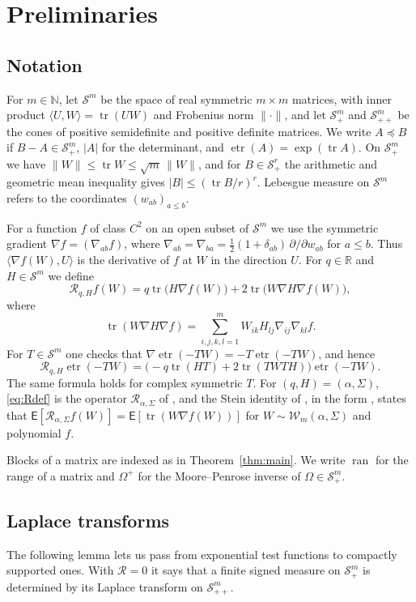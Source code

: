 \documentclass{amsart}
\theoremstyle{definition}
\theoremstyle{remark}
\numberwithin{equation}{section}
\newcommand{\R}{\mathbb{R}}
\newcommand{\N}{\mathbb{N}}
\newcommand{\E}{\mathsf{E}}
\newcommand{\Sym}{\mathcal{S}}
\newcommand{\W}{\mathcal{W}}
\newcommand{\Rop}{\mathcal{R}}
\newcommand{\tr}{\operatorname{tr}}
\newcommand{\etr}{\operatorname{etr}}
\newcommand{\ran}{\operatorname{ran}}
\newcommand{\ip}[2]{\langle #1,#2\rangle}
\begin{document}
\section{Preliminaries}\label{sec:prelim}

\subsection{Notation}
For $m\in\N$, let $\Sym^m$ be the space of real symmetric $m\times m$ matrices, with inner product $\ip UW=\tr(UW)$ and Frobenius norm $\|\cdot\|$, and let $\Sym^m_+$ and $\Sym^m_{++}$ be the cones of positive semidefinite and positive definite matrices. We write $A\preceq B$ if $B-A\in\Sym^m_+$, $|A|$ for the determinant, and $\etr(A)=\exp(\tr A)$. On $\Sym^m_+$ we have $\|W\|\le\tr W\le\sqrt m\,\|W\|$, and for $B\in\Sym^r_+$ the arithmetic and geometric mean inequality gives $|B|\le(\tr B/r)^r$. Lebesgue measure on $\Sym^m$ refers to the coordinates $(w_{ab})_{a\le b}$.

For a function $f$ of class $C^2$ on an open subset of $\Sym^m$ we use the symmetric gradient $\nabla f=(\nabla_{ab}f)$, where $\nabla_{ab}=\nabla_{ba}=\frac12(1+\delta_{ab})\,\partial/\partial w_{ab}$ for $a\le b$. Thus $\ip{\nabla f(W)}{U}$ is the derivative of $f$ at $W$ in the direction $U$. For $q\in\R$ and $H\in\Sym^m$ we define
\begin{equation}\label{eq:Rdef}
\Rop_{q,H}f(W)=q\tr\bigl(H\nabla f(W)\bigr)+2\tr\bigl(W\nabla H\nabla f(W)\bigr),
\end{equation}
where
\[
\tr(W\nabla H\nabla f)=\sum_{i,j,k,l=1}^m W_{ik}H_{lj}\nabla_{ij}\nabla_{kl}f.
\]
For $T\in\Sym^m$ one checks that $\nabla\etr(-TW)=-T\etr(-TW)$, and hence
\begin{equation}\label{eq:Rexp}
\Rop_{q,H}\etr(-TW)=\bigl(-q\tr(HT)+2\tr(TWTH)\bigr)\etr(-TW).
\end{equation}
The same formula holds for complex symmetric $T$. For $(q,H)=(\alpha,\Sigma)$, \eqref{eq:Rdef} is the operator $\mathcal R_{\alpha,\Sigma}$ of \cite[(3.2)]{GO26}, and the Stein identity of \cite{BGORS26}, in the form \cite[(3.1)]{GO26}, states that $\E[\Rop_{\alpha,\Sigma}f(W)]=\E[\tr(W\nabla f(W))]$ for $W\sim\W_m(\alpha,\Sigma)$ and polynomial $f$.

Blocks of a matrix are indexed as in Theorem~\ref{thm:main}. We write $\ran$ for the range of a matrix and $\Omega^+$ for the Moore--Penrose inverse of $\Omega\in\Sym^m_+$.

\subsection{Laplace transforms}
The following lemma lets us pass from exponential test functions to compactly supported ones. With $\Rop=0$ it says that a finite signed measure on $\Sym^m_+$ is determined by its Laplace transform on $\Sym^m_{++}$.
\end{document}
